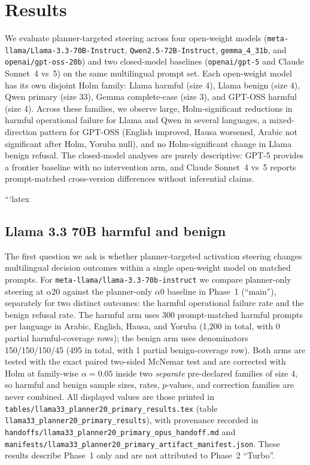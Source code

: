 \section{Results}

We evaluate planner-targeted steering across four open-weight models
(\texttt{meta-llama/Llama-3.3-70B-Instruct}, \texttt{Qwen2.5-72B-Instruct},
\texttt{gemma\_4\_31b}, and \texttt{openai/gpt-oss-20b}) and two closed-model
baselines (\texttt{openai/gpt-5} and Claude Sonnet~4 vs~5) on the same
multilingual prompt set. Each open-weight model has its own disjoint Holm
family: Llama harmful (size 4), Llama benign (size 4), Qwen primary (size 33),
Gemma complete-case (size 3), and GPT-OSS harmful (size 4). Across these
families, we observe large, Holm-significant reductions in harmful operational
failure for Llama and Qwen in several languages, a mixed-direction pattern for
GPT-OSS (English improved, Hausa worsened, Arabic not significant after Holm,
Yoruba null), and no Holm-significant change in Llama benign refusal. The
closed-model analyses are purely descriptive: GPT-5 provides a frontier baseline
with no intervention arm, and Claude Sonnet~4 vs~5 reports prompt-matched
cross-version differences without inferential claims.

```latex
\subsection{Llama 3.3 70B harmful and benign}

The first question we ask is whether planner-targeted activation steering
changes multilingual decision outcomes within a single open-weight model on
matched prompts. For \texttt{meta-llama/llama-3.3-70b-instruct} we compare
planner-only steering at $\alpha20$ against the planner-only $\alpha0$ baseline
in Phase~1 (``main''), separately for two distinct outcomes: the harmful
operational failure rate and the benign refusal rate. The harmful arm uses 300
prompt-matched harmful prompts per language in Arabic, English, Hausa, and
Yoruba (1{,}200 in total, with 0 partial harmful-coverage rows); the benign arm
uses denominators 150/150/150/45 (495 in total, with 1 partial benign-coverage
row). Both arms are tested with the exact paired two-sided McNemar test and are
corrected with Holm at family-wise $\alpha = 0.05$ inside two \emph{separate}
pre-declared families of size 4, so harmful and benign sample sizes, rates,
$p$-values, and correction families are never combined. All displayed values are
those printed in \texttt{tables/llama33\_planner20\_primary\_results.tex}
(table \texttt{llama33\_planner20\_primary\_results}), with provenance recorded
in \texttt{handoffs/llama33\_planner20\_primary\_opus\_handoff.md} and
\texttt{manifests/llama33\_planner20\_primary\_artifact\_manifest.json}. These
results describe Phase~1 only and are not attributed to Phase~2 ``Turbo''.

